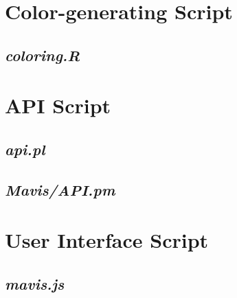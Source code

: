 \renewcommand{\appendixname}{Appendix}

\lstset{
basicstyle=\footnotesize\ttfamily,
numbers=left,
numberstyle=\tiny,
stepnumber=2,
numbersep=25pt,
tabsize=2,
extendedchars=true,
breaklines=true,
}

\begin{appendices}

\chapter{Color-generating Script}
\section*{\emph{coloring.R}}


\chapter{API Script}
\section*{\emph{api.pl}}

\section*{\emph{Mavis/API.pm}}


\chapter{User Interface Script}
\section*{\emph{mavis.js}}


\end{appendices}